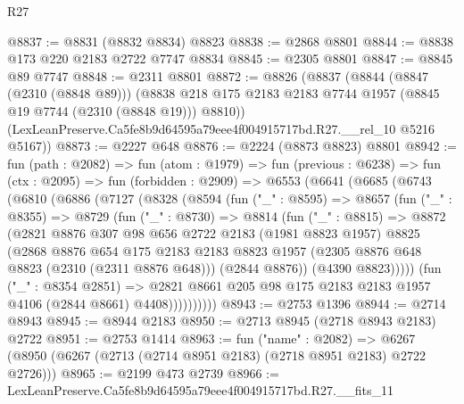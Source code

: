 \begin{lexlean}{R27}
\begin{coremodule}
@8837 := @8831 (@8832 @8834) @8823
@8838 := @2868 @8801
@8844 := @8838 @173 @220 @2183 @2722 @7747 @8834
@8845 := @2305 @8801
@8847 := @8845 @89 @7747
@8848 := @2311 @8801
@8872 := @8826
    (@8837
      (@8844
        (@8847 (@2310 (@8848 @89)))
        (@8838 @218 @175 @2183 @2183 @7744 @1957 (@8845 @19 @7744 (@2310 (@8848 @19))) @8810))
      (LexLeanPreserve.Ca5fe8b9d64595a79eee4f004915717bd.R27.__rel_10 @5216 @5167))
@8873 := @2227 @648
@8876 := @2224 (@8873 @8823) @8801
@8942 := fun (path : @2082) =>
  fun (atom : @1979) =>
  fun (previous : @6238) =>
  fun (ctx : @2095) =>
  fun (forbidden : @2909) =>
  @6553
    (@6641
      (@6685
        (@6743
          (@6810
            (@6886
              (@7127
                (@8328
                  (@8594
                    (fun ("_" : @8595) =>
                    @8657
                      (fun ("_" : @8355) =>
                      @8729
                        (fun ("_" : @8730) =>
                        @8814
                          (fun ("_" : @8815) =>
                          @8872
                            (@2821
                              @8876
                              @307
                              @98
                              @656
                              @2722
                              @2183
                              (@1981 @8823 @1957)
                              @8825
                              (@2868
                                @8876
                                @654
                                @175
                                @2183
                                @2183
                                @8823
                                @1957
                                (@2305 @8876 @648 @8823 (@2310 (@2311 @8876 @648)))
                                (@2844 @8876))
                              (@4390 @8823)))))
                      (fun ("_" : @8354 @2851) =>
                      @2821
                        @8661
                        @205
                        @98
                        @175
                        @2183
                        @2183
                        @1957
                        @4106
                        (@2844 @8661)
                        @4408))))))))))
@8943 := @2753 @1396
@8944 := @2714 @8943
@8945 := @8944 @2183
@8950 := @2713 @8945 (@2718 @8943 @2183) @2722
@8951 := @2753 @1414
@8963 := fun ("name" : @2082) =>
  @6267 (@8950 (@6267 (@2713 (@2714 @8951 @2183) (@2718 @8951 @2183) @2722 @2726)))
@8965 := @2199 @473 @2739
@8966 := LexLeanPreserve.Ca5fe8b9d64595a79eee4f004915717bd.R27.__fits_11

\end{coremodule}
\end{lexlean}
